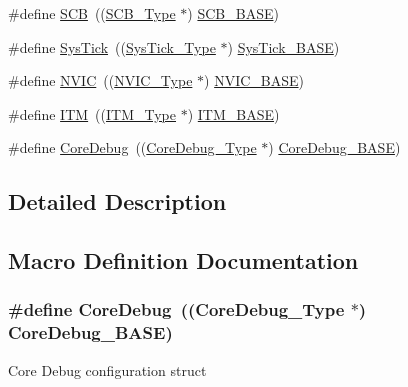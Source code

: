 \begin{DoxyCompactItemize}
\item 
\#define \hyperlink{group___c_m_s_i_s___c_m3__core__register_gaaaf6477c2bde2f00f99e3c2fd1060b01}{S\+CB}~((\hyperlink{struct_s_c_b___type}{S\+C\+B\+\_\+\+Type} $\ast$)           \hyperlink{openmotestm_2library_2inc_2stm32f10x__map_8h_ad55a7ddb8d4b2398b0c1cfec76c0d9fd}{S\+C\+B\+\_\+\+B\+A\+SE})
\item 
\#define \hyperlink{group___c_m_s_i_s___c_m3__core__register_gacd96c53beeaff8f603fcda425eb295de}{Sys\+Tick}~((\hyperlink{struct_sys_tick___type}{Sys\+Tick\+\_\+\+Type} $\ast$)       \hyperlink{openmotestm_2library_2inc_2stm32f10x__map_8h_a58effaac0b93006b756d33209e814646}{Sys\+Tick\+\_\+\+B\+A\+SE})
\item 
\#define \hyperlink{group___c_m_s_i_s___c_m3__core__register_gac8e97e8ce56ae9f57da1363a937f8a17}{N\+V\+IC}~((\hyperlink{struct_n_v_i_c___type}{N\+V\+I\+C\+\_\+\+Type} $\ast$)          \hyperlink{openmotestm_2library_2inc_2stm32f10x__map_8h_aa0288691785a5f868238e0468b39523d}{N\+V\+I\+C\+\_\+\+B\+A\+SE})
\item 
\#define \hyperlink{group___c_m_s_i_s___c_m3__core__register_gabae7cdf882def602cb787bb039ff6a43}{I\+TM}~((\hyperlink{struct_i_t_m___type}{I\+T\+M\+\_\+\+Type} $\ast$)           \hyperlink{group___c_m_s_i_s___c_m3__core__register_gadd76251e412a195ec0a8f47227a8359e}{I\+T\+M\+\_\+\+B\+A\+SE})
\item 
\#define \hyperlink{group___c_m_s_i_s___c_m3__core__register_gab6e30a2b802d9021619dbb0be7f5d63d}{Core\+Debug}~((\hyperlink{struct_core_debug___type}{Core\+Debug\+\_\+\+Type} $\ast$)     \hyperlink{group___c_m_s_i_s___c_m3__core__register_ga680604dbcda9e9b31a1639fcffe5230b}{Core\+Debug\+\_\+\+B\+A\+SE})
\end{DoxyCompactItemize}


\subsection{Detailed Description}


\subsection{Macro Definition Documentation}
\subsubsection[{\texorpdfstring{Core\+Debug}{CoreDebug}}]{\setlength{\rightskip}{0pt plus 5cm}\#define Core\+Debug~(({\bf Core\+Debug\+\_\+\+Type} $\ast$)     {\bf Core\+Debug\+\_\+\+B\+A\+SE})}\hypertarget{group___c_m_s_i_s___c_m3__core__register_gab6e30a2b802d9021619dbb0be7f5d63d}{}\label{group___c_m_s_i_s___c_m3__core__register_gab6e30a2b802d9021619dbb0be7f5d63d}
Core Debug configuration struct 

